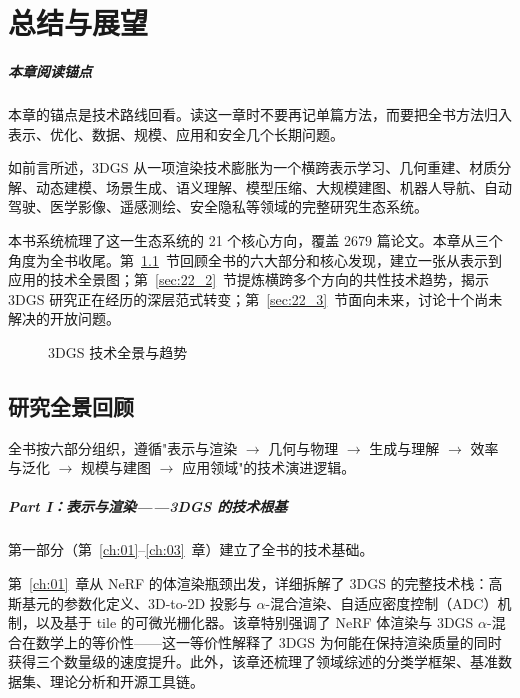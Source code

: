 \chapter{总结与展望}
\label{ch:22}

\paragraph*{本章阅读锚点}
本章的锚点是技术路线回看。读这一章时不要再记单篇方法，而要把全书方法归入表示、优化、数据、规模、应用和安全几个长期问题。


如前言所述，3DGS 从一项渲染技术膨胀为一个横跨表示学习、几何重建、材质分解、动态建模、场景生成、语义理解、模型压缩、大规模建图、机器人导航、自动驾驶、医学影像、遥感测绘、安全隐私等领域的完整研究生态系统。

本书系统梳理了这一生态系统的 21 个核心方向，覆盖 2679 篇论文。本章从三个角度为全书收尾。第~\ref{sec:22_1}~节回顾全书的六大部分和核心发现，建立一张从表示到应用的技术全景图；第~\ref{sec:22_2}~节提炼横跨多个方向的共性技术趋势，揭示 3DGS 研究正在经历的深层范式转变；第~\ref{sec:22_3}~节面向未来，讨论十个尚未解决的开放问题。

\begin{figure}[htbp]
\centering
\resizebox{\textwidth}{!}{}
\caption{3DGS 技术全景与趋势}
\label{fig:ch22_outlook_taxonomy}
\end{figure}

\section{研究全景回顾}
\label{sec:22_1}

全书按六部分组织，遵循"表示与渲染 $\to$ 几何与物理 $\to$ 生成与理解 $\to$ 效率与泛化 $\to$ 规模与建图 $\to$ 应用领域"的技术演进逻辑。

\paragraph{Part I：表示与渲染——3DGS 的技术根基}
第一部分（第~\ref{ch:01}--\ref{ch:03}~章）建立了全书的技术基础。

第~\ref{ch:01}~章从 NeRF 的体渲染瓶颈出发，详细拆解了 3DGS 的完整技术栈：高斯基元的参数化定义、3D-to-2D 投影与 $\alpha$-混合渲染、自适应密度控制（ADC）机制，以及基于 tile 的可微光栅化器。该章特别强调了 NeRF 体渲染与 3DGS $\alpha$-混合在数学上的等价性——这一等价性解释了 3DGS 为何能在保持渲染质量的同时获得三个数量级的速度提升。此外，该章还梳理了领域综述的分类学框架、基准数据集、理论分析和开源工具链。

